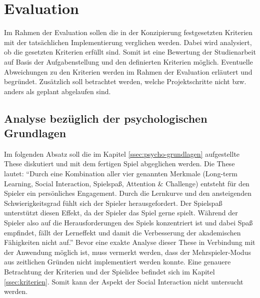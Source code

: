 \section{Evaluation}
    Im Rahmen der Evaluation sollen die in der Konzipierung festgesetzten Kriterien mit der tatsächlichen Implementierung verglichen werden. Dabei wird analysiert, ob die gesetzten Kriterien erfüllt sind. Somit ist eine Bewertung der Studienarbeit auf Basis der Aufgabenstellung und den definierten Kriterien möglich.
    Eventuelle Abweichungen zu den Kriterien werden im Rahmen der Evaluation erläutert und begründet. Zusätzlich soll betrachtet werden, welche Projektschritte nicht bzw. anders als geplant abgelaufen sind.

\subsection{Analyse bezüglich der psychologischen Grundlagen}
Im folgenden Absatz soll die im Kapitel \ref{ssec:psycho-grundlagen} aufgestellte These diskutiert und mit dem fertigen Spiel abgeglichen werden. Die These lautet:
\enquote{Durch eine Kombination aller vier genannten Merkmale (Long-term Learning, Social Interaction, Spielspaß, Attention \& Challenge) entsteht für den Spieler ein persönliches Engagement. Durch die Lernkurve und den ansteigenden Schwierigkeitsgrad fühlt sich der Spieler herausgefordert. Der Spielspaß unterstützt diesen Effekt, da der Spieler das Spiel gerne spielt. Während der Spieler also auf die Herausforderungen des Spiels konzentriert ist und dabei Spaß empfindet, fällt der Lerneffekt und damit die Verbesserung der akademischen Fähigkeiten nicht auf.}
Bevor eine exakte Analyse dieser These in Verbindung mit der Anwendung möglich ist, muss vermerkt werden, dass der Mehrspieler-Modus aus zeitlichen Gründen nicht implementiert werden konnte. Eine genauere Betrachtung der Kriterien und der Spielidee befindet sich im Kapitel \ref{ssec:kriterien}. Somit kann der Aspekt der Social Interaction nicht untersucht werden.
